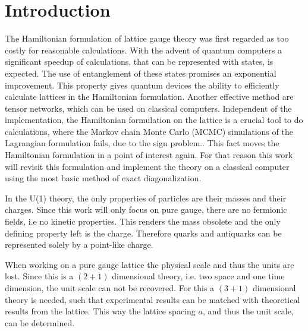 \section{Introduction}
The Hamiltonian formulation of lattice gauge theory was first regarded as too costly for reasonable calculations. With the advent of quantum computers a significant speedup of calculations, that can be represented with states, is expected. The use of entanglement of these states promises an exponential improvement. This property gives quantum devices the ability to efficiently calculate lattices in the Hamiltonian formulation.\cite{Feynman1982, Bañuls2020} Another effective method are tensor networks, which can be used on classical computers. Independent of the implementation, the Hamiltonian formulation on the lattice is a crucial tool to do calculations, where the Markov chain Monte Carlo (MCMC) simulations of the Lagrangian formulation fails, due to the sign problem.\cite{Garofalo:2024VV}. This fact moves the Hamiltonian formulation in a point of interest again. For that reason this work will revisit this formulation and implement the theory on a classical computer using the most basic method of exact diagonalization.

In the U(1) theory, the only properties of particles are their masses and their charges. Since this work will only focus on pure gauge, there are no fermionic fields, i.e no kinetic properties. This renders the mass obsolete and the only defining property left is the charge. Therefore quarks and antiquarks can be represented solely by a point-like charge.

When working on a pure gauge lattice the physical scale and thus the units are lost. Since this is a $(2+1)$ dimensional theory, i.e. two space and one time dimension, the unit scale can not be recovered. For this a $(3+1)$ dimensional theory is needed, such that experimental results can be matched with theoretical results from the lattice. This way the lattice spacing $a$, and thus the unit scale, can be determined.


